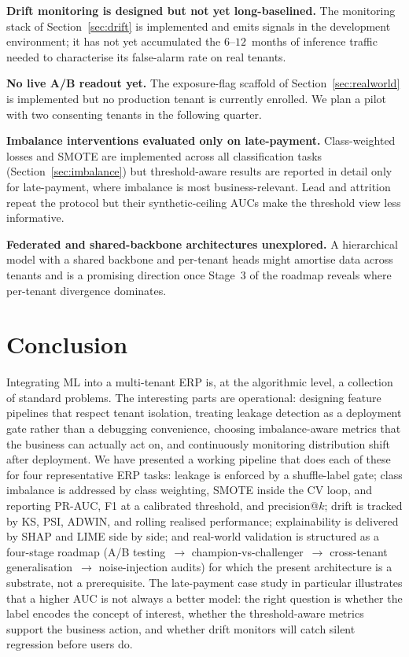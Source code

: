 \documentclass[conference]{IEEEtran}
\begin{document}
\textbf{Drift monitoring is designed but not yet long-baselined.} The
monitoring stack of Section~\ref{sec:drift} is implemented and emits signals
in the development environment; it has not yet accumulated the
$6$--$12$~months of inference traffic needed to characterise its
false-alarm rate on real tenants.

\textbf{No live A/B readout yet.} The exposure-flag scaffold of
Section~\ref{sec:realworld} is implemented but no production tenant is
currently enrolled. We plan a pilot with two consenting tenants in the
following quarter.

\textbf{Imbalance interventions evaluated only on late-payment.}
Class-weighted losses and SMOTE are implemented across all classification
tasks (Section~\ref{sec:imbalance}) but threshold-aware results are
reported in detail only for late-payment, where imbalance is most
business-relevant. Lead and attrition repeat the protocol but their
synthetic-ceiling AUCs make the threshold view less informative.

\textbf{Federated and shared-backbone architectures unexplored.} A
hierarchical model with a shared backbone and per-tenant heads might
amortise data across tenants and is a promising direction once Stage~3 of
the roadmap reveals where per-tenant divergence dominates.

\section{Conclusion}
\label{sec:conclusion}

Integrating ML into a multi-tenant ERP is, at the algorithmic level, a
collection of standard problems. The interesting parts are operational:
designing feature pipelines that respect tenant isolation, treating leakage
detection as a deployment gate rather than a debugging convenience,
choosing imbalance-aware metrics that the business can actually act on,
and continuously monitoring distribution shift after deployment. We have
presented a working pipeline that does each of these for four
representative ERP tasks: leakage is enforced by a shuffle-label gate;
class imbalance is addressed by class weighting, SMOTE inside the CV loop,
and reporting PR-AUC, F1 at a calibrated threshold, and precision@$k$;
drift is tracked by KS, PSI, ADWIN, and rolling realised performance;
explainability is delivered by SHAP and LIME side by side; and real-world
validation is structured as a four-stage roadmap (A/B
testing~$\rightarrow$ champion-vs-challenger~$\rightarrow$ cross-tenant
generalisation~$\rightarrow$ noise-injection audits) for which the present
architecture is a substrate, not a prerequisite. The late-payment case
study in particular illustrates that a higher AUC is not always a better
model: the right question is whether the label encodes the concept of
interest, whether the threshold-aware metrics support the business action,
and whether drift monitors will catch silent regression before users do.
\end{document}
